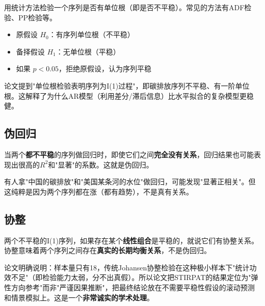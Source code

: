\documentclass[12pt, a4paper]{article}
\begin{document}
\begin{conceptbox}[单位根检验]
用统计方法检验一个序列是否有单位根（即是否不平稳）。常见的方法有ADF检验、PP检验等。
\end{conceptbox}

\begin{itemize}[leftmargin=2em]
\item 原假设 $H_0$：有序列单位根（不平稳）
\item 备择假设 $H_1$：无单位根（平稳）
\item 如果 $p < 0.05$，拒绝原假设，认为序列平稳
\end{itemize}

\begin{purplebox}[论文的发现]
论文提到"单位根检验表明序列为I(1)过程"，即碳排放序列不平稳、有一阶单位根。这解释了为什么AR模型（利用差分/滞后信息）比水平拟合的复杂模型更稳健。
\end{purplebox}

\subsection{伪回归}

\begin{warningbox}
当两个\textbf{都不平稳}的序列做回归时，即使它们之间\textbf{完全没有关系}，回归结果也可能表现出很高的$R^2$和"显著"的系数。这就是伪回归。
\end{warningbox}

\begin{examplebox}[经典例子]
有人拿"中国的碳排放"和"美国某条河的水位"做回归，可能发现"显著正相关"。但这纯粹是因为两个序列都在涨（都有趋势），不是真有关系。
\end{examplebox}

\subsection{协整}

\begin{conceptbox}[协整]
两个不平稳的I(1)序列，如果存在某个\textbf{线性组合}是平稳的，就说它们有协整关系。协整意味着两个序列之间存在\textbf{真实的长期均衡关系}，不是伪回归。
\end{conceptbox}

\begin{warningbox}[论文为什么没做协整检验？]
论文明确说明：样本量只有18，传统Johansen协整检验在这种极小样本下"统计功效不足"（即检验能力太弱，分不出真假）。所以论文把STIRPAT的结果定位为"弹性方向参考"而非"严谨因果推断"，把最终结论放在不需要平稳性假设的滚动预测和情景模拟上。这是一个\textbf{非常诚实的学术处理}。
\end{warningbox}
\end{document}
